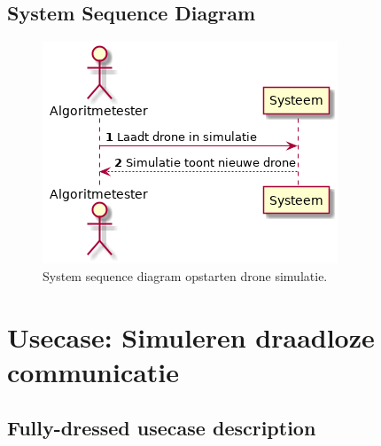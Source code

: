 \documentclass[a4paper, 11pt, oneside]{report}
\begin{document}
\subsection{System Sequence Diagram}
\label{Usecase:simulatiedrone:systemsequence}

\begin{figure}[H]
	\begin{center}\includegraphics[height=.2\textheight]{UML/out/usecase/sequence/SimulerenDrone/SimulerenDrone.png}\end{center}
	\caption{System sequence diagram opstarten drone simulatie.}
	\label{fig:simulatiedrone:systemsequence}
\end{figure}

\hypertarget{draadlozecom}{
\section[Simuleren draadloze communicatie]{Usecase: Simuleren draadloze communicatie}}
\label{Usecase:simmulatiecommuicatie}
\subsection{Fully-dressed usecase description}
\end{document}
